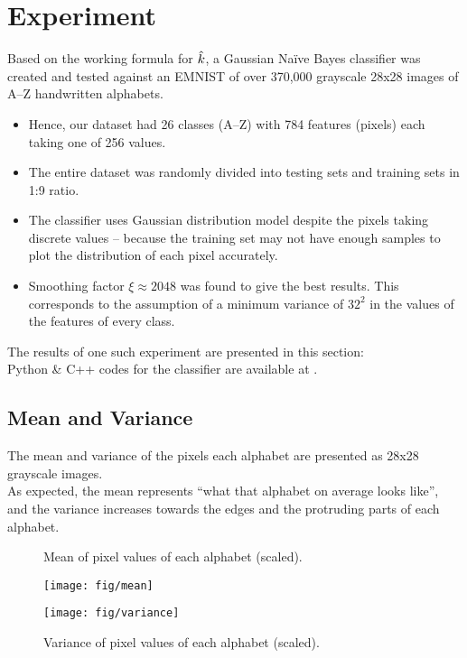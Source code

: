 \section{Experiment}

Based on the working formula for $\hat{k}$, a Gaussian Na\"ive Bayes classifier was created and tested against 
an EMNIST 
of over 370,000 grayscale 28x28 images of A--Z handwritten alphabets.
\begin{itemize}[noitemsep]
	\item Hence, our dataset had 26 classes (A--Z) with 784 features (pixels) each taking one of 256 values.
	\item The entire dataset was randomly divided into testing sets and training sets in 1:9 ratio.
	\item The classifier uses Gaussian distribution model despite the pixels taking discrete values -- because the training set may not have enough samples to plot the distribution of each pixel accurately.
	\item Smoothing factor $\xi \approx 2048$ was found to give the best results. This corresponds to the assumption of a minimum variance of $32^2$ in the values of the features of every class.
\end{itemize}
The results of one such experiment are presented in this section:\\
Python \& C++ codes for the classifier are available at .

\subsection{Mean and Variance}
The mean and variance of the pixels each alphabet are presented as 28x28 grayscale images. \\
As expected, the mean represents ``what that alphabet on average looks like'', and the variance increases towards the edges and the protruding parts of each alphabet.
\begin{figure}[h]
	\centering
	\caption{Mean of pixel values of each alphabet (scaled).}\par
	\texttt{[image: fig/mean]}
	\caption{Variance of pixel values of each alphabet (scaled).}\par
	\texttt{[image: fig/variance]}
\end{figure}

